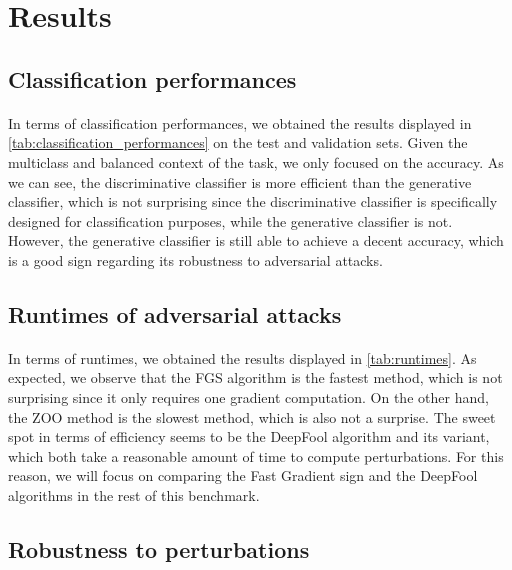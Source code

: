 \documentclass[10pt,twocolumn,letterpaper]{article}
\begin{document}
\section{Results}
\label{sec:results}

\subsection{Classification performances}

\paragraph{} In terms of classification performances, we obtained the results displayed in \cref{tab:classification_performances} on the test and validation sets. Given the multiclass and balanced context of the task, we only focused on the accuracy. As we can see, the discriminative classifier is more efficient than the generative classifier, which is not surprising since the discriminative classifier is specifically designed for classification purposes, while the generative classifier is not. However, the generative classifier is still able to achieve a decent accuracy, which is a good sign regarding its robustness to adversarial attacks.

\subsection{Runtimes of adversarial attacks}

\paragraph{} In terms of runtimes, we obtained the results displayed in \cref{tab:runtimes}. As expected, we observe that the FGS algorithm is the fastest method, which is not surprising since it only requires one gradient computation. On the other hand, the ZOO method is the slowest method, which is also not a surprise. The sweet spot in terms of efficiency seems to be the DeepFool algorithm and its variant, which both take a reasonable amount of time to compute perturbations. For this reason, we will focus on comparing the Fast Gradient sign and the DeepFool algorithms in the rest of this benchmark.

\subsection{Robustness to perturbations}
\end{document}
